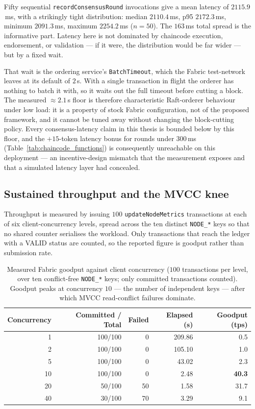 Fifty sequential \texttt{recordConsensusRound} invocations give a mean latency of $\mathbf{2115.9}$\,ms, with a strikingly tight distribution: median $2110.4$\,ms, p95 $2172.3$\,ms, minimum $2091.3$\,ms, maximum $2254.2$\,ms ($n=50$). The $163$\,ms total spread is the informative part. Latency here is not dominated by chaincode execution, endorsement, or validation --- if it were, the distribution would be far wider --- but by a fixed wait.

That wait is the ordering service's \texttt{BatchTimeout}, which the Fabric test-network leaves at its default of $2$\,s. With a single transaction in flight the orderer has nothing to batch it with, so it waits out the full timeout before cutting a block. The measured $\approx 2.1$\,s floor is therefore characteristic Raft-orderer behaviour under low load: it is a property of stock Fabric configuration, not of the proposed framework, and it cannot be tuned away without changing the block-cutting policy. Every consensus-latency claim in this thesis is bounded below by this floor, and the $+15$-token latency bonus for rounds under $300$\,ms (Table~\ref{tab:chaincode_functions}) is consequently unreachable on this deployment --- an incentive-design mismatch that the measurement exposes and that a simulated latency layer had concealed.

\subsection*{Sustained throughput and the MVCC knee}

Throughput is measured by issuing $100$ \texttt{updateNodeMetrics} transactions at each of six client-concurrency levels, spread across the ten distinct \texttt{NODE\_*} keys so that no shared counter serialises the workload. Only transactions that reach the ledger with a VALID status are counted, so the reported figure is goodput rather than submission rate.

\begin{table}[H]
\centering
\caption{Measured Fabric goodput against client concurrency ($100$ transactions per level, over ten conflict-free \texttt{NODE\_*} keys; only committed transactions counted). Goodput peaks at concurrency $10$ --- the number of independent keys --- after which MVCC read-conflict failures dominate.}
\label{tab:fabric_throughput}
\small\setlength{\tabcolsep}{6pt}
\begin{tabular}{|r|r|r|r|r|}
\hline
Concurrency & Committed / Total & Failed & Elapsed (s) & Goodput (tps) \\ \hline
1  & 100/100 & 0  & 209.86 & 0.5 \\ \hline
2  & 100/100 & 0  & 105.10 & 1.0 \\ \hline
5  & 100/100 & 0  & 43.02  & 2.3 \\ \hline
10 & 100/100 & 0  & 2.48   & \textbf{40.3} \\ \hline
20 & 50/100  & 50 & 1.58   & 31.7 \\ \hline
40 & 30/100  & 70 & 3.29   & 9.1 \\ \hline
\end{tabular}
\end{table}

